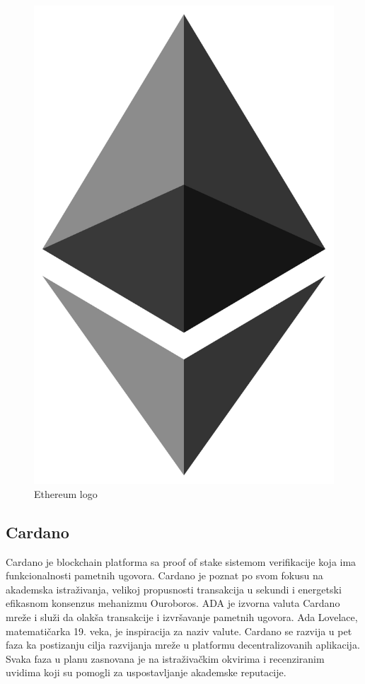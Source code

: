 \documentclass[a4paper]{article}
\begin{document}
{\begin{figure}[h!]
\begin{center}
\includegraphics[scale=0.1]{slike/slika4.png}
\end{center}
\caption{Ethereum logo}
\label{fig:ethereum}
\end{figure}


\subsection{Cardano}
\label{subsec:cardano}
Cardano je blockchain platforma sa proof of stake sistemom verifikacije koja ima funkcionalnosti pametnih ugovora. Cardano je poznat po svom fokusu na akademska istraživanja, velikoj propusnosti transakcija u sekundi i energetski efikasnom konsenzus mehanizmu Ouroboros. ADA je izvorna valuta Cardano mreže i služi da olakša transakcije i izvršavanje pametnih ugovora.  Ada Lovelace, matematičarka 19. veka, je inspiracija za naziv valute. Cardano se razvija u pet faza ka postizanju cilja razvijanja mreže u platformu decentralizovanih aplikacija. Svaka faza u planu zasnovana je na istraživačkim okvirima i recenziranim uvidima koji su pomogli za uspostavljanje akademske reputacije.\cite{različitekriptovalute}

}
\end{document}
